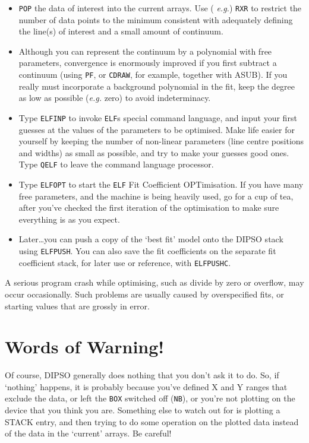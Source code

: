 \begin{itemize}

\item {\tt POP} the data of interest into the current arrays. Use ({\em
e.g.}) {\tt RXR} to restrict the number of data points to the minimum
consistent with adequately defining the line(s) of interest and a
small amount of continuum.

\item Although you can represent the continuum by a polynomial with
free parameters, convergence is enormously improved if you first
subtract a continuum (using {\tt PF}, or {\tt CDRAW}, for example,
together with ASUB). If you really must incorporate a background
polynomial in the fit, keep the degree as low as possible ({\em e.g.}
zero) to avoid indeterminacy.

\item Type {\tt ELFINP} to invoke {\tt ELF}s special command language,
and input your first guesses at the values of the parameters to be
optimised. Make life easier for yourself by keeping the number of
non-linear parameters (line centre positions and widths) as small as
possible, and try to make your guesses good ones. Type {\tt QELF} to
leave the command language processor.

\item Type {\tt ELFOPT} to start the {\tt ELF} Fit Coefficient
OPTimisation. If you have many free parameters, and the machine is
being heavily used, go for a cup of tea, after you've checked the
first iteration of the optimisation to make sure everything is as you
expect.

\item Later\ldots you can push a copy of the `best fit' model onto the
DIPSO stack using {\tt ELFPUSH}. You can also save the fit
coefficients on the separate fit coefficient stack, for later use or
reference, with {\tt ELFPUSHC}.

\end{itemize}

A serious program crash while optimising, such as divide by zero or
overflow, may occur occasionally. Such problems are usually caused by
overspecified fits, or starting values that are grossly in error.

\section {Words of Warning!}

Of course, DIPSO generally does nothing that you don't ask it to do.
So, if `nothing' happens, it is probably because you've defined X and
Y ranges that exclude the data, or left the {\tt BOX} switched off
({\tt NB}), or you're not plotting on the device that you think you
are. Something else to watch out for is plotting a STACK entry, and
then trying to do some operation on the plotted data instead of the
data in the `current' arrays. Be careful!

